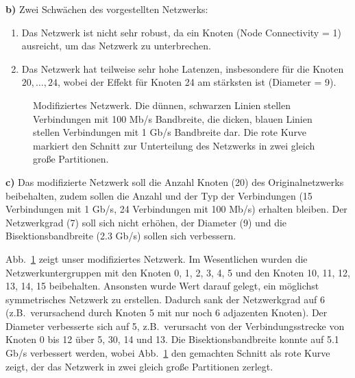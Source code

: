 \textbf{b)} Zwei Schwächen des vorgestellten Netzwerks:
\begin{enumerate}
 \item Das Netzwerk ist nicht sehr robust, da ein Knoten (Node Connectivity = 1) ausreicht, um das Netzwerk zu unterbrechen.
 \item Das Netzwerk hat teilweise sehr hohe Latenzen, insbesondere für die Knoten $20,\dots,24$, wobei der Effekt für Knoten 24 am stärksten ist (Diameter = 9). 
\end{enumerate}

\begin{figure}[tb]
 \centering 
 
 \caption{Modifiziertes Netzwerk. Die dünnen, schwarzen Linien stellen Verbindungen mit 100 Mb/s Bandbreite, die dicken, blauen Linien stellen Verbindungen mit 1 Gb/s Bandbreite dar. Die rote Kurve markiert den Schnitt zur Unterteilung des Netzwerks in zwei gleich große Partitionen.}
 \label{fig:eigenesNetzwerk}
\end{figure}

\textbf{c)} Das modifizierte Netzwerk soll die Anzahl Knoten (20) des Originalnetzwerks beibehalten, zudem sollen die Anzahl und der Typ der Verbindungen (15 Verbindungen mit 1 Gb/s, 24 Verbindungen mit 100 Mb/s) erhalten bleiben. Der Netzwerkgrad (7) soll sich nicht erhöhen, der Diameter (9) und die Bisektionsbandbreite (2.3 Gb/s) sollen sich verbessern.

Abb.~\ref{fig:eigenesNetzwerk} zeigt unser modifiziertes Netzwerk. Im Wesentlichen wurden die Netzwerkuntergruppen mit den Knoten 0, 1, 2, 3, 4, 5 und den Knoten 10, 11, 12, 13, 14, 15 beibehalten. Ansonsten wurde Wert darauf gelegt, ein möglichst symmetrisches Netzwerk zu erstellen. Dadurch sank der Netzwerkgrad auf 6 (z.B.~verursachend durch Knoten 5 mit nur noch 6 adjazenten Knoten). Der Diameter verbesserte sich auf 5, z.B.~verursacht von der Verbindungsstrecke von Knoten 0 bis 12 über 5, 30, 14 und 13. Die Bisektionsbandbreite konnte auf 5.1 Gb/s verbessert werden, wobei Abb.~\ref{fig:eigenesNetzwerk} den gemachten Schnitt als rote Kurve zeigt, der das Netzwerk in zwei gleich große Partitionen zerlegt.